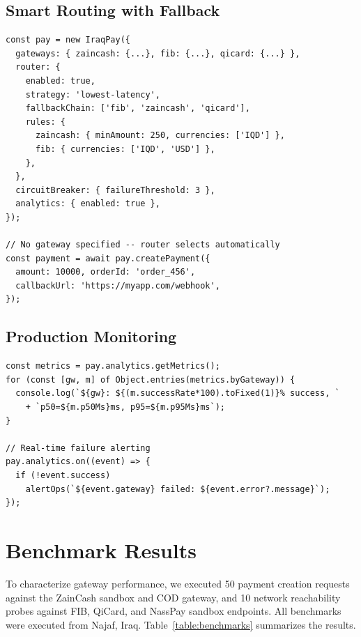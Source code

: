 \documentclass[10pt, a4paper, oneside]{article}
\begin{document}
\subsection{Smart Routing with Fallback}

\begin{lstlisting}[style=typescript,caption={Automatic gateway selection with fallback},label={lst:routing}]
const pay = new IraqPay({
  gateways: { zaincash: {...}, fib: {...}, qicard: {...} },
  router: {
    enabled: true,
    strategy: 'lowest-latency',
    fallbackChain: ['fib', 'zaincash', 'qicard'],
    rules: {
      zaincash: { minAmount: 250, currencies: ['IQD'] },
      fib: { currencies: ['IQD', 'USD'] },
    },
  },
  circuitBreaker: { failureThreshold: 3 },
  analytics: { enabled: true },
});

// No gateway specified -- router selects automatically
const payment = await pay.createPayment({
  amount: 10000, orderId: 'order_456',
  callbackUrl: 'https://myapp.com/webhook',
});
\end{lstlisting}

\subsection{Production Monitoring}

\begin{lstlisting}[style=typescript,caption={Accessing per-gateway metrics and events},label={lst:metrics}]
const metrics = pay.analytics.getMetrics();
for (const [gw, m] of Object.entries(metrics.byGateway)) {
  console.log(`${gw}: ${(m.successRate*100).toFixed(1)}% success, `
    + `p50=${m.p50Ms}ms, p95=${m.p95Ms}ms`);
}

// Real-time failure alerting
pay.analytics.on((event) => {
  if (!event.success)
    alertOps(`${event.gateway} failed: ${event.error?.message}`);
});
\end{lstlisting}


\section{Benchmark Results}

To characterize gateway performance, we executed 50 payment creation requests against the ZainCash sandbox and COD gateway, and 10 network reachability probes against FIB, QiCard, and NassPay sandbox endpoints. All benchmarks were executed from Najaf, Iraq. Table~\ref{table:benchmarks} summarizes the results.
\end{document}
